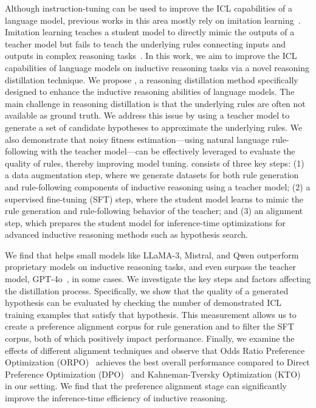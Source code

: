 Although instruction-tuning can be used to improve the ICL capabilities of a language model, previous works in this area mostly rely on imitation learning~\citep{huang2022incontextlearningdistillationtransferring,alpaca,vicuna2023}. Imitation learning teaches a student model to directly mimic the outputs of a teacher model but fails to teach the underlying rules connecting inputs and outputs in complex reasoning tasks~\citep{mukherjee2023orcaprogressivelearningcomplex}. 
In this work, we aim to improve the ICL capabilities of language models on inductive reasoning tasks via a novel reasoning distillation technique. We propose \proposed, a reasoning distillation method specifically designed to enhance the inductive reasoning abilities of language models. 
The main challenge in reasoning distillation is that the underlying rules are often not available as ground truth. We address this issue by using a teacher model to generate a set of candidate hypotheses to approximate the underlying rules. We also demonstrate that noisy fitness estimation—using natural language rule-following with the teacher model—can be effectively leveraged to evaluate the quality of rules, thereby improving model tuning.
\proposed consists of three key steps: (1) a data augmentation step, where we generate datasets for both rule generation and rule-following components of inductive reasoning using a teacher model; (2) a supervised fine-tuning (SFT) step, where the student model learns to mimic the rule generation and rule-following behavior of the teacher; and (3) an alignment step, which prepares the student model for inference-time optimizations for advanced inductive reasoning methods such as hypothesis search.

We find that \proposed helps small models like LLaMA-3, Mistral, and Qwen outperform proprietary models on inductive reasoning tasks, and even surpass the teacher model, GPT-4o~\citep{openai2024gpt4ocard}, in some cases.
We investigate the key steps and factors affecting the distillation process. Specifically, we show that the quality of a generated hypothesis can be evaluated by checking the number of demonstrated ICL training examples that satisfy that hypothesis. This measurement allows us to create a preference alignment corpus for rule generation and to filter the SFT corpus, both of which positively impact performance.
Finally, we examine the effects of different alignment techniques and observe that Odds Ratio Preference Optimization (ORPO)~\citep{hong2024orpomonolithicpreferenceoptimization} achieves the best overall performance compared to Direct Preference Optimization (DPO)~\citep{rafailov2024directpreferenceoptimizationlanguage} and Kahneman-Tversky Optimization (KTO)~\citep{ethayarajh2024ktomodelalignmentprospect} in our setting. We find that the preference alignment stage can significantly improve the inference-time efficiency of inductive reasoning.

